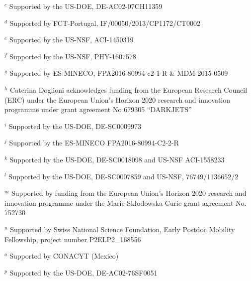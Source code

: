 \par {\footnotesize $^{c}$ Supported by the US-DOE, DE-AC02-07CH11359}
\par {\footnotesize $^{d}$ Supported by FCT-Portugal, IF/00050/2013/CP1172/CT0002}
\par {\footnotesize $^{e}$ Supported by the US-NSF, ACI-1450319}
\par {\footnotesize $^{f}$ Supported by the US-NSF, PHY-1607578}
\par {\footnotesize $^{g}$ Supported by ES-MINECO, FPA2016-80994-c2-1-R \& MDM-2015-0509}
\par {\footnotesize $^{h}$ Caterina Doglioni acknowledges funding from the European Research Council (ERC) under the European Union's Horizon 2020 research and innovation programme under grant agreement No 679305 “DARKJETS”}
\par {\footnotesize $^{i}$ Supported by the US-DOE, DE-SC0009973}
\par {\footnotesize $^{j}$ Supported by the ES-MINECO FPA2016-80994-C2-2-R}
\par {\footnotesize $^{k}$ Supported by the US-DOE, DE-SC0018098 and US-NSF ACI-1558233}
\par {\footnotesize $^{l}$ Supported by the US-DOE, DE-SC0007859 and US-NSF, 76749/1136652/2}
\par {\footnotesize $^{m}$ Supported by funding from the European Union’s Horizon 2020 research and innovation programme under the Marie Skłodowska-Curie grant agreement No. 752730}
\par {\footnotesize $^{n}$ Supported by Swiss National Science Foundation, Early Postdoc Mobility Fellowship, project number P2ELP2\_168556}
\par {\footnotesize $^{o}$ Supported by CONACYT (Mexico)}
\par {\footnotesize $^{p}$ Supported by the US-DOE, DE-AC02-76SF0051}
